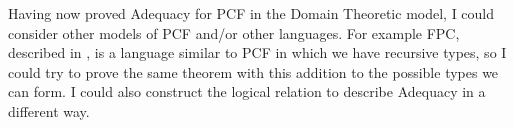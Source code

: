 Having now proved Adequacy for PCF in the Domain Theoretic model, I could consider other models of PCF and/or other languages. For example FPC, described in \citep{Harper16}, is a language similar to PCF in which we have recursive types, so I could try to prove the same theorem with this addition to the possible types we can form. I could also construct the  logical relation to describe Adequacy in a different way.










